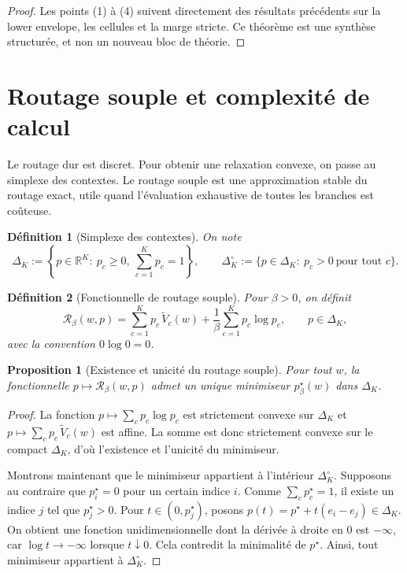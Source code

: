 \documentclass[11pt,a4paper]{article}
\newtheorem{definition}{Définition}[section]
\newtheorem{proposition}{Proposition}[section]
\newcommand{\R}{\mathbb R}
\newcommand{\Rcal}{\mathcal R}
\begin{document}
\begin{proof}
Les points (1) à (4) suivent directement des résultats précédents sur la lower envelope, les cellules et la marge stricte. Ce théorème est une synthèse structurée, et non un nouveau bloc de théorie.
\end{proof}

\section{Routage souple et complexité de calcul}

Le routage dur est discret. Pour obtenir une relaxation convexe, on passe au simplexe des contextes. Le routage souple est une approximation stable du routage exact, utile quand l'évaluation exhaustive de toutes les branches est coûteuse.

\begin{definition}[Simplexe des contextes]
On note
\[
\Delta_K:=\left\{p\in\R^K:\ p_c\ge 0,\ \sum_{c=1}^K p_c=1\right\},
\qquad
\Delta_K^\circ:=\{p\in\Delta_K:\ p_c>0\ \text{pour tout }c\}.
\]
\end{definition}

\begin{definition}[Fonctionnelle de routage souple]
Pour \(\beta>0\), on définit
\[
\Rcal_\beta(w,p)
=
\sum_{c=1}^K p_c\,\widetilde V_c(w)
+\frac{1}{\beta}\sum_{c=1}^K p_c\log p_c,
\qquad p\in\Delta_K,
\]
avec la convention \(0\log 0=0\).
\end{definition}

\begin{proposition}[Existence et unicité du routage souple]
Pour tout \(w\), la fonctionnelle \(p\mapsto \Rcal_\beta(w,p)\) admet un unique minimiseur \(p^\star_\beta(w)\) dans \(\Delta_K\).
\end{proposition}

\begin{proof}
La fonction \(p\mapsto \sum_c p_c\log p_c\) est strictement convexe sur \(\Delta_K\) et \(p\mapsto \sum_c p_c\,\widetilde V_c(w)\) est affine. La somme est donc strictement convexe sur le compact \(\Delta_K\), d'où l'existence et l'unicité du minimiseur.

Montrons maintenant que le minimiseur appartient à l'intérieur \(\Delta_K^\circ\). Supposons au contraire que \(p^\star_i=0\) pour un certain indice \(i\). Comme \(\sum_c p^\star_c=1\), il existe un indice \(j\) tel que \(p^\star_j>0\). Pour \(t\in(0,p^\star_j)\), posons \(p(t)=p^\star+t(e_i-e_j)\in\Delta_K\). On obtient une fonction unidimensionnelle dont la dérivée à droite en \(0\) est \(-\infty\), car \(\log t\to-\infty\) lorsque \(t\downarrow 0\). Cela contredit la minimalité de \(p^\star\). Ainsi, tout minimiseur appartient à \(\Delta_K^\circ\).
\end{proof}
\end{document}
